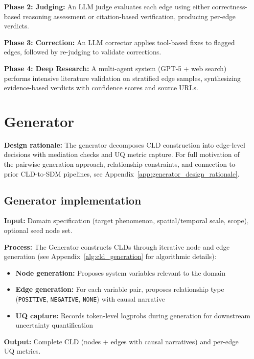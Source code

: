 \textbf{Phase 2: Judging:} An LLM judge evaluates each edge using either correctness-based reasoning assessment or citation-based verification, producing per-edge verdicts.

\textbf{Phase 3: Correction:} An LLM corrector applies tool-based fixes to flagged edges, followed by re-judging to validate corrections.

\textbf{Phase 4: Deep Research:} A multi-agent system (GPT-5 + web search) performs intensive literature validation on stratified edge samples, synthesizing evidence-based verdicts with confidence scores and source URLs.

\section{Generator}
\label{sec:generator}

\textbf{Design rationale:} The generator decomposes CLD construction into edge-level decisions with mediation checks and UQ metric capture. For full motivation of the pairwise generation approach, relationship constraints, and connection to prior CLD-to-SDM pipelines, see Appendix~\ref{app:generator_design_rationale}.

\subsection{Generator implementation}
\textbf{Input:} Domain specification (target phenomenon, spatial/temporal scale, scope), optional seed node set.

\textbf{Process:} The Generator constructs CLDs through iterative node and edge generation (see Appendix~\ref{alg:cld_generation} for algorithmic details):
\begin{itemize}[noitemsep]
    \item \textbf{Node generation:} Proposes system variables relevant to the domain
    \item \textbf{Edge generation:} For each variable pair, proposes relationship type (\texttt{POSITIVE}, \texttt{NEGATIVE}, \texttt{NONE}) with causal narrative
    \item \textbf{UQ capture:} Records token-level logprobs during generation for downstream uncertainty quantification
\end{itemize}

\textbf{Output:} Complete CLD (nodes + edges with causal narratives) and per-edge UQ metrics.

